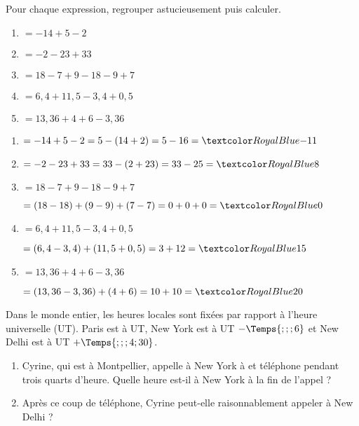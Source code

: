 \begin{Maquette}[Fiche,CorrigeFin,Colonnes=2]{}
\begin{multicols}{2}
      
      \begin{exercice}[Dur] %
         Pour chaque expression, regrouper astucieusement puis calculer.
         \begin{enumerate}[label=\Alph*]
            \item $=-14+5-2$
            \item $=-2-23+33$
            \item $=18-7+9-18-9+7$
            \item $=6,4+11,5-3,4+0,5$
            \item $=13,36+4+6-3,36$
         \end{enumerate}
      \end{exercice}
      
      \begin{Solution}
         \begin{enumerate}[label=\Alph*]
            \item $=-14+5-2 =5-(14+2) =5-16 =\cor{-11}$
            \item $=-2-23+33 =33-(2+23) =33-25 =\cor{8}$
            \item $=18-7+9-18-9+7$ \par
               $=(18-18)+(9-9)+(7-7) =0+0+0 =\cor{0}$
            \item $=6,4+11,5-3,4+0,5$ \par
               $=(6,4-3,4)+(11,5+0,5) =3+12 =\cor{15}$
            \item $=13,36+4+6-3,36$ \par
               $=(13,36-3,36)+(4+6) =10+10 =\cor{20}$
         \end{enumerate}
      \end{Solution}
      
      
      \begin{exercice} %
         Dans le monde entier, les heures locales sont fixées par rapport à l'heure universelle (UT). Paris est à UT, New York est à UT $-\Temps{;;;6}$ et New Delhi est à UT $+\Temps{;;;4;30}$.
         \begin{enumerate}
            \item Cyrine, qui est à Montpellier, appelle à New York à  et téléphone pendant trois quarts d'heure. Quelle heure est-il à New York à la fin de l'appel ?
            \item Après ce coup de téléphone, Cyrine peut-elle raisonnablement appeler à New Delhi ?
         \end{enumerate}
      \end{exercice}
      

\end{multicols}
\end{Maquette}
